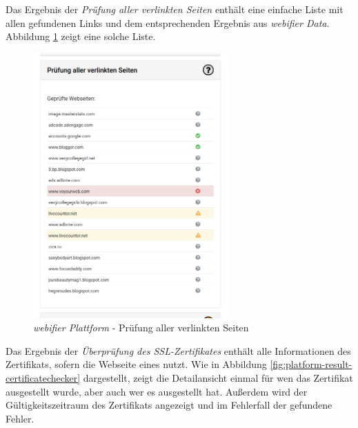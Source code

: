 \newpage

Das Ergebnis der \textit{Prüfung aller verlinkten Seiten} enthält eine einfache Liste mit allen
gefundenen Links und dem entsprechenden Ergebnis aus \textit{webifier Data}. Abbildung
\ref{fig:platform-result-linkchecker} zeigt eine solche Liste.

\begin{figure}[H]
  \centering
  \includegraphics[width=7.5cm]{images/platform/linkchecker-undefined}
  \caption{\textit{webifier Plattform} - Prüfung aller verlinkten Seiten}
  \label{fig:platform-result-linkchecker}
\end{figure}

\newpage

Das Ergebnis der \textit{Überprüfung des SSL-Zertifikates} enthält alle Informationen des
Zertifikats, sofern die Webseite eines nutzt. Wie in Abbildung
\ref{fig:platform-result-certificatechecker} dargestellt, zeigt die Detailansicht einmal für wen
das Zertifikat ausgestellt wurde, aber auch wer es ausgestellt hat. Außerdem wird der
Gültigkeitszeitraum des Zertifikats angezeigt und im Fehlerfall der gefundene Fehler.

